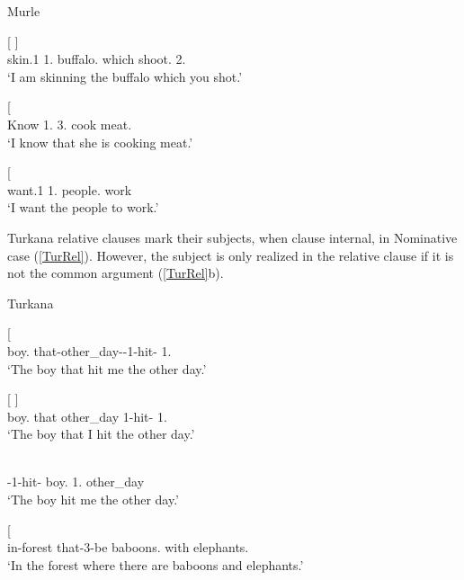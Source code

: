 \begin{exe}\ex\label{MurDep} {Murle} \citep[Surmic; Sudan; ][112, 113, 114]{Arensen:1982}\nopagebreak[4]
\begin{xlist}
\ex\gll{}    {\rm[}  \textbf{}{\rm]}\\
skin.1\sg{} 1\sg{}.\nom{} buffalo.\acc{} which shoot.\pst{} 2\sg{}.\nom{}\\
`I am skinning the buffalo which you shot.'

\ex\gll{}   {\rm[}\textbf{}  \textipa{idiN}{\rm]}\\
Know 1\sg{}.\nom{} 3\sg{}.\acc{} cook meat.\acc{}\\
`I know that she is cooking meat.'

\ex\gll{}   {\rm[}\textbf{} \textipa{kiliNliNit}{\rm]}\\
want.1\sg{} 1\sg{}.\nom{} people.\acc{} work\\
`I want the people to work.'
\end{xlist}
\end{exe}
 

Turkana relative clauses mark their subjects, when clause internal, in Nominative  case (\ref{TurRel}).
However, the subject is only realized in the relative clause if it is not the common argument  (\ref{TurRel}b).

\begin{exe}\ex\label{TurRel} {Turkana} \citep[Nilotic; Kenya; ][309, 314]{Dimmendaal:1982}\nopagebreak
\begin{xlist}
\ex\gll{}  {\rm[} \textipa{a-yON\`{}}{\rm]}\\
boy.\acc{} that-other\_day-\transitiv{}-1\sg{}-hit-\asp{} 1\sg{}.\acc{}\\
`The boy that hit me the other day.'

\ex\gll{}  {\rm[}   \textbf{}{\rm]}\\
boy.\acc{} that other\_day 1\sg{}-hit-\asp{} 1\sg{}.\nom{}\\
`The boy that I hit the other day.'

\ex\gll{}   \\
\transitiv{}-1\sg{}-hit-\asp{} boy.\nom{} 1\sg{}.\acc{} other\_day\\
`The boy hit me the other day.'

\ex\gll{}  {\rm[}    \textipa{NI-tOm-E\`{}}{\rm]}\\
in-forest that-3-be baboons.\nom{} with elephants.\acc{}\\
`In the forest where there are baboons and elephants.'  %
\end{xlist}
\end{exe}

